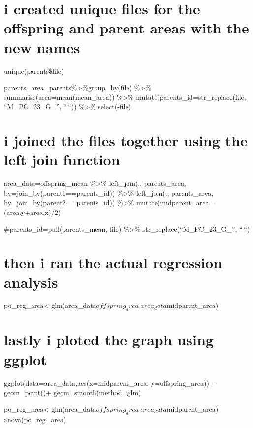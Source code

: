 \documentclass[
]{article}
\begin{document}
\hypertarget{i-created-unique-files-for-the-offspring-and-parent-areas-with-the-new-names}{%
\section{i created unique files for the offspring and parent areas with
the new
names}\label{i-created-unique-files-for-the-offspring-and-parent-areas-with-the-new-names}}

unique(parents\$file)

parents\_area=parents\%\textgreater\%group\_by(file) \%\textgreater\%
summarise(area=mean(mean\_area)) \%\textgreater\%
mutate(parents\_id=str\_replace(file, ``M\_PC\_23\_G\_'', ``\,``))
\%\textgreater\% select(-file)

\hypertarget{i-joined-the-files-together-using-the-left-join-function}{%
\section{i joined the files together using the left join
function}\label{i-joined-the-files-together-using-the-left-join-function}}

area\_data=offspring\_mean \%\textgreater\% left\_join(., parents\_area,
by=join\_by(parent1==parents\_id)) \%\textgreater\% left\_join(.,
parents\_area, by=join\_by(parent2==parents\_id)) \%\textgreater\%
mutate(midparent\_area=(area.y+area.x)/2)

\#parents\_id=pull(parents\_mean, file) \%\textgreater\%
str\_replace(``M\_PC\_23\_G\_'', ``\,``)

\hypertarget{then-i-ran-the-actual-regression-analysis}{%
\section{then i ran the actual regression
analysis}\label{then-i-ran-the-actual-regression-analysis}}

po\_reg\_area\textless-glm(area\_data\(offspring_area~area_data\)midparent\_area)

\hypertarget{lastly-i-ploted-the-graph-using-ggplot}{%
\section{lastly i ploted the graph using
ggplot}\label{lastly-i-ploted-the-graph-using-ggplot}}

ggplot(data=area\_data,aes(x=midparent\_area, y=offspring\_area))+
geom\_point()+ geom\_smooth(method=glm)

po\_reg\_area\textless-glm(area\_data\(offspring_area~area_data\)midparent\_area)
anova(po\_reg\_area)
\end{document}
